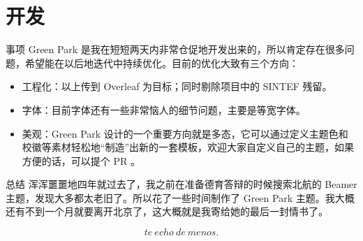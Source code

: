 \documentclass{ctexbeamer}
\begin{document}
\section{开发}
\begin{frame}{事项}
  Green Park 是我在短短两天内非常仓促地开发出来的，所以肯定存在很多问题，希望能在以后地迭代中持续优化。目前的优化大致有三个方向：

  \begin{itemize}
  \item 工程化：以上传到 Overleaf 为目标；同时剔除项目中的 SINTEF 残留。
  \item 字体：目前字体还有一些非常恼人的细节问题，主要是等宽字体。
  \item 美观：Green Park 设计的一个重要方向就是多态，它可以通过定义主题色和校徽等素材轻松地“制造”出新的一套模板，欢迎大家自定义自己的主题，如果方便的话，可以提个 PR 。
  \end{itemize}
\end{frame}

\begin{frame}{总结}
  浑浑噩噩地四年就过去了，我之前在准备德育答辩的时候搜索北航的 Beamer 主题，发现大多都太老旧了。所以花了一些时间制作了 Green Park 主题。我大概还有不到一个月就要离开北京了，这大概就是我寄给她的最后一封情书了。

  $$
  te \ echo\  de\  menos.
  $$

\end{frame}


\backmatter
\end{document}
